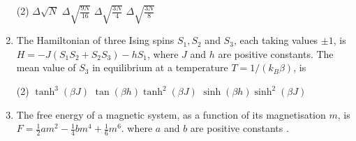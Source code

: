 \begin{enumerate}
 \begin{tasks}(2)
	\task[\textbf{a.}]$\Delta \sqrt{N}$
	\task[\textbf{b.}] $\Delta \sqrt{\frac{9 N}{16}}$
	\task[\textbf{c.}]$\Delta \sqrt{\frac{3 N}{4}}$
	\task[\textbf{d.}] $\Delta \sqrt{\frac{3 N}{8}}$
\end{tasks}
\item The Hamiltonian of three Ising spins $S_{1}, S_{2}$ and $S_{3}$, each taking values $\pm 1$, is $H=-J\left(S_{1} S_{2}+S_{2} S_{3}\right)-h S_{1}$, where $J$ and $h$ are positive constants. The mean value of $S_{3}$ in equilibrium at a temperature $T=1 /\left(k_{B} \beta\right)$, is
 \begin{tasks}(2)
	\task[\textbf{a.}]$\tanh ^{3}(\beta J)$
	\task[\textbf{b.}]$\tan (\beta h) \tanh ^{2}(\beta J)$
	\task[\textbf{c.}]$\sinh (\beta h) \sinh ^{2}(\beta J)$
\end{tasks}
\item The free energy of a magnetic system, as a function of its magnetisation $m$, is $F=\frac{1}{2} a m^{2}-\frac{1}{4} b m^{4}+\frac{1}{6} m^{6}$. where $a$ and $b$ are positive constants $.$


\end{enumerate}
